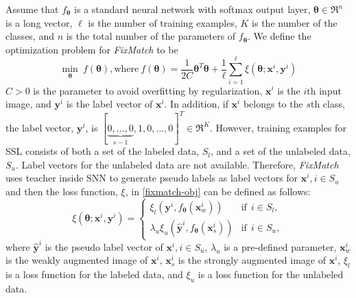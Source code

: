 \documentclass{article}
\def\bx{{\boldsymbol x}}
\def\by{{\boldsymbol y}}
\def\btheta{\boldsymbol \theta}
\begin{document}
\par Assume that $f_{\btheta}$ is a standard neural network with softmax output layer,
$\btheta \in \Re^n$ is a long vector, $\ell$ is the number of training examples, $K$ is the number of the classes, and $n$ is the total number of the parameters of $f_{\btheta}$.
We define the optimization problem for {\sl FixMatch} to be
\begin{equation}
\label{fixmatch-obj}
    \min_{\btheta}\ f(\btheta), \text{where}\ f(\btheta) = 
    \frac{1}{2C} \btheta^T \btheta + 
    \frac{1}{\ell} \sum_{i=1}^\ell \xi(\btheta;\bx^i,\by^i)
\end{equation}
$C > 0$ is the parameter to avoid overfitting by regularization, $\bx^i$ is the $i$th input image, and $\by^i$ is the label vector of $\bx^i$.
In addition, if $\bx^i$ belongs to the $s$th class, the label vector, $\by^i$, is $[\underbrace{0, \ldots, 0}_{s-1}, 1, 0, \ldots, 0]^T \in \Re^K$.
However, training examples for SSL consists of both a set of the labeled data, $S_l$, and a set of the unlabeled data, $S_u$.
Label vectors for the unlabeled data are not available.
Therefore, {\sl FixMatch} uses teacher inside SNN to generate pseudo labels as label vectors for $\bx^i, i \in S_u$  
and then the loss function, $\xi$, in \eqref{fixmatch-obj} can be defined as follows:
\begin{equation}
\label{fixmatch-loss}
    \xi(\btheta;\bx^i,\by^i) = 
    \begin{cases}
        \xi_l\left(\by^i, f_{\btheta}(\bx^i_{w})\right) & \text{if}\ \ i \in S_{l},\\
        \lambda_u \xi_u(\hat{\by}^i, f_{\btheta}(\bx^i_{s})) & \text{if}\ \ i \in S_{u},
    \end{cases}
\end{equation}
where $\hat{\by}^i$ is the pseudo label vector of $\bx^i, i \in S_u$, $\lambda_u$ is a pre-defined parameter, $\bx^i_w$ is the weakly augmented image of $\bx^i$, $\bx^i_s$ is the strongly augmented image of $\bx^i$,
$\xi_l$ is a loss function for the labeled data, and $\xi_u$ is a loss function for the unlabeled data.
\end{document}
